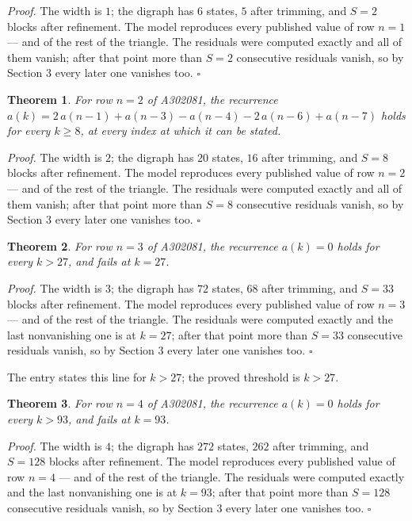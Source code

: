 \documentclass[11pt]{article}
\newtheorem{theorem}{Theorem}
\theoremstyle{definition}
\begin{document}
{\itshape Proof.} The width is $1$; the digraph has $6$ states, $5$ after trimming, and $S = 2$ blocks after refinement. The model reproduces every published value of row $n = 1$ --- and of the rest of the triangle. The residuals were computed exactly and all of them vanish; after that point more than $S = 2$ consecutive residuals vanish, so by Section 3 every later one vanishes too. $\square$

\begin{theorem} For row $n = 2$ of A302081, the recurrence $a(k) = 2\,a(n-1) + a(n-3) - a(n-4) - 2\,a(n-6) + a(n-7)$ holds for every $k \ge 8$, at every index at which it can be stated.\end{theorem}

{\itshape Proof.} The width is $2$; the digraph has $20$ states, $16$ after trimming, and $S = 8$ blocks after refinement. The model reproduces every published value of row $n = 2$ --- and of the rest of the triangle. The residuals were computed exactly and all of them vanish; after that point more than $S = 8$ consecutive residuals vanish, so by Section 3 every later one vanishes too. $\square$

\begin{theorem} For row $n = 3$ of A302081, the recurrence $a(k) = 0$ holds for every $k > 27$, and fails at $k = 27$.\end{theorem}

{\itshape Proof.} The width is $3$; the digraph has $72$ states, $68$ after trimming, and $S = 33$ blocks after refinement. The model reproduces every published value of row $n = 3$ --- and of the rest of the triangle. The residuals were computed exactly and the last nonvanishing one is at $k = 27$; after that point more than $S = 33$ consecutive residuals vanish, so by Section 3 every later one vanishes too. $\square$

The entry states this line for $k > 27$; the proved threshold is $k > 27$.

\begin{theorem} For row $n = 4$ of A302081, the recurrence $a(k) = 0$ holds for every $k > 93$, and fails at $k = 93$.\end{theorem}

{\itshape Proof.} The width is $4$; the digraph has $272$ states, $262$ after trimming, and $S = 128$ blocks after refinement. The model reproduces every published value of row $n = 4$ --- and of the rest of the triangle. The residuals were computed exactly and the last nonvanishing one is at $k = 93$; after that point more than $S = 128$ consecutive residuals vanish, so by Section 3 every later one vanishes too. $\square$
\end{document}
